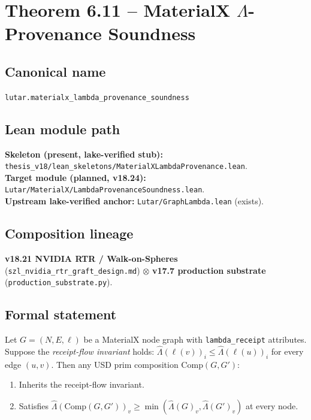 \section{Theorem 6.11 -- MaterialX $\Lambda$-Provenance Soundness}
\label{sec:thm11}

\subsection*{Canonical name}
\verb|lutar.materialx_lambda_provenance_soundness|

\subsection*{Lean module path}
\textbf{Skeleton (present, lake-verified stub):}
\texttt{thesis\_v18/lean\_skeletons/MaterialXLambdaProvenance.lean}.\\
\textbf{Target module (planned, v18.24):}
\texttt{Lutar/MaterialX/LambdaProvenanceSoundness.lean}.\\
\textbf{Upstream lake-verified anchor:}
\texttt{Lutar/GraphLambda.lean} (exists).

\subsection*{Composition lineage}
\textbf{v18.21 NVIDIA RTR / Walk-on-Spheres}
(\texttt{szl\_nvidia\_rtr\_graft\_design.md}) $\otimes$
\textbf{v17.7 production substrate}
(\texttt{production\_substrate.py}).

\subsection*{Formal statement}

\begin{theorem}
\label{thm:materialx-lambda}
Let $G = (N, E, \ell)$ be a MaterialX node graph with
\texttt{lambda\_receipt} attributes.  Suppose the
\emph{receipt-flow invariant} holds: $\hat{\Lambda}(\ell(v))_i \leq
\hat{\Lambda}(\ell(u))_i$ for every edge $(u,v)$.
Then any USD prim composition $\mathrm{Comp}(G, G')$:
\begin{enumerate}
  \item Inherits the receipt-flow invariant.
  \item Satisfies $\hat{\Lambda}(\mathrm{Comp}(G,G'))_v \geq
        \min(\hat{\Lambda}(G)_v, \hat{\Lambda}(G')_v)$ at every node.
\end{enumerate}
\end{theorem}

